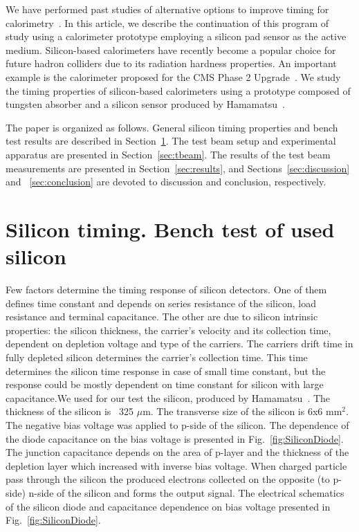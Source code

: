 \documentclass[12pt]{article}
\begin{document}
{We have performed past studies of alternative options to improve 
timing for calorimetry~\cite{Anderson:2015gha, MCPFastCaloNIMA, Ronzhin2015288,Ronzhin201552}.
In this article, we describe the continuation of this program of study using a calorimeter
prototype employing a silicon pad sensor as the active medium. Silicon-based
calorimeters have recently become a popular choice for future hadron colliders due to its radiation 
hardness properties. An important example is the calorimeter proposed for the CMS Phase 2
Upgrade~\cite{Butler:2020886}. We study the timing properties of silicon-based calorimeters
using a prototype composed of tungsten absorber and a silicon sensor produced by 
Hamamatsu~\cite{hamamatsu}. 

The paper is organized as follows. General silicon timing properties 
and bench test results are described in Section~\ref{sec:siliconpad}. 
The test beam setup and experimental apparatus are presented in Section~\ref{sec:tbeam}. 
The results of the test beam measurements are presented in Section~\ref{sec:results},
and Sections~\ref{sec:discussion} and ~\ref{sec:conclusion} are devoted to discussion and 
conclusion, respectively.


\section{Silicon timing. Bench test of used silicon}
\label{sec:siliconpad}








Few factors determine the timing response of silicon detectors. One of them
defines time constant and depends on series resistance of the silicon, load
resistance and terminal capacitance. The other are due to silicon intrinsic
properties: the silicon thickness, the carrier’s velocity and its collection
time, dependent on depletion voltage and type of the carriers. The carriers
drift time in fully depleted silicon determines the carrier’s collection time.
This time determines the silicon time response in case of small time constant,
but the response could be mostly dependent on time constant for silicon with
large capacitance.We used for our test the silicon, produced by Hamamatsu~\cite{hamamatsu}. The
thickness of the silicon is ~325 $\mu$m. The transverse size of the silicon is
6x6 mm$^2$. The negative bias voltage was applied to p-side of the silicon. The
dependence of the diode capacitance on the bias voltage is presented in
Fig.~\ref{fig:SiliconDiode}. The junction capacitance depends on the area of
p-layer and the thickness of the depletion layer which increased with inverse
bias voltage. When charged particle pass through the silicon the produced
electrons collected on the opposite (to p-side) n-side of the silicon and forms
the output signal. The electrical schematics of the silicon diode and
capacitance dependence on bias voltage presented in Fig.~\ref{fig:SiliconDiode}.


}
\end{document}
